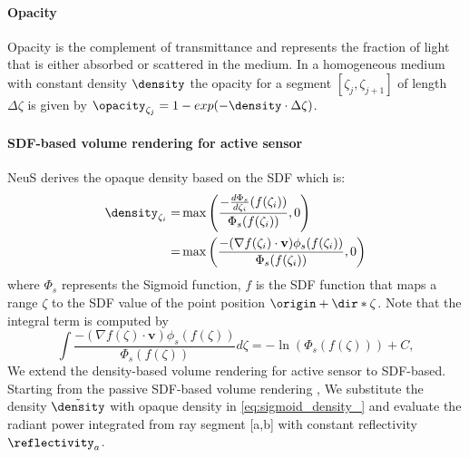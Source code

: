 \paragraph{Opacity}
Opacity is the complement of transmittance and represents the fraction of light that is either absorbed or scattered in the medium. In a homogeneous medium with constant density $\density$  the opacity for a segment $[\zeta_j, \zeta_{j+1}]$ of length $\Delta \zeta$ is given by $\opacity_{\zeta_j} = 1 - exp(-\density \cdot \Delta \zeta)$.

\paragraph{SDF-based volume rendering for active sensor}
NeuS\cite{wang2021neus} derives the opaque density based on the SDF which is:
\begin{equation}
\begin{split}
\density_{\zeta_i} =&  \max\left(\frac{-\frac{d\Phi_s}{d\zeta_i}(f(\zeta_i))}{\Phi_s(f(\zeta_i))},0\right)\\
                  =& \max\left(\frac{-(\nabla f(\zeta_i)\cdot \mathbf{v})\phi_s(f(\zeta_i))}{\Phi_s(f(\zeta_i))}, 0\right)
\end{split}
\label{eq:sigmoid_density_}
\end{equation}
where $\Phi_s$ represents the Sigmoid function, $f$ is the SDF function that maps a range $\zeta$ to the SDF value of the point position $\origin + \dir * \zeta$. Note that the integral term is computed by
\begin{equation}
\int \frac{-(\nabla f(\zeta)\cdot \mathbf{v})\phi_s(f(\zeta))}{\Phi_s(f(\zeta))}d\zeta = -\ln(\Phi_s(f(\zeta))) + C,
\label{eq:intergration_density}
\end{equation}
We extend the density-based volume rendering for active sensor to SDF-based. Starting from the passive SDF-based volume rendering \cite{wang2021neus}, We substitute the density $\tilde{\density}$ with opaque density in \cref{eq:sigmoid_density_}
and evaluate the radiant power integrated from ray segment [a,b] with constant reflectivity $\reflectivity_a$.

